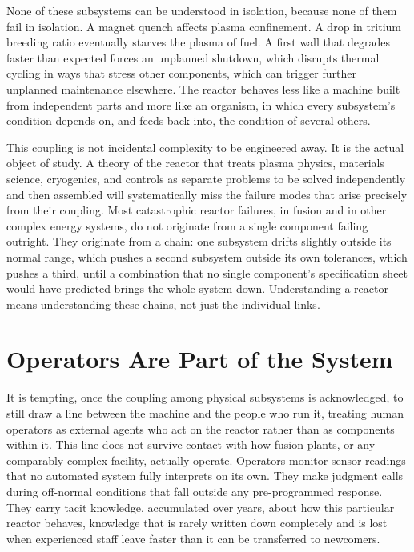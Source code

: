 None of these subsystems can be understood in isolation, because none of them fail in isolation. A magnet quench affects plasma confinement. A drop in tritium breeding ratio eventually starves the plasma of fuel. A first wall that degrades faster than expected forces an unplanned shutdown, which disrupts thermal cycling in ways that stress other components, which can trigger further unplanned maintenance elsewhere. The reactor behaves less like a machine built from independent parts and more like an organism, in which every subsystem's condition depends on, and feeds back into, the condition of several others.

This coupling is not incidental complexity to be engineered away. It is the actual object of study. A theory of the reactor that treats plasma physics, materials science, cryogenics, and controls as separate problems to be solved independently and then assembled will systematically miss the failure modes that arise precisely from their coupling. Most catastrophic reactor failures, in fusion and in other complex energy systems, do not originate from a single component failing outright. They originate from a chain: one subsystem drifts slightly outside its normal range, which pushes a second subsystem outside its own tolerances, which pushes a third, until a combination that no single component's specification sheet would have predicted brings the whole system down. Understanding a reactor means understanding these chains, not just the individual links.

\section{Operators Are Part of the System}

It is tempting, once the coupling among physical subsystems is acknowledged, to still draw a line between the machine and the people who run it, treating human operators as external agents who act on the reactor rather than as components within it. This line does not survive contact with how fusion plants, or any comparably complex facility, actually operate. Operators monitor sensor readings that no automated system fully interprets on its own. They make judgment calls during off-normal conditions that fall outside any pre-programmed response. They carry tacit knowledge, accumulated over years, about how this particular reactor behaves, knowledge that is rarely written down completely and is lost when experienced staff leave faster than it can be transferred to newcomers.

